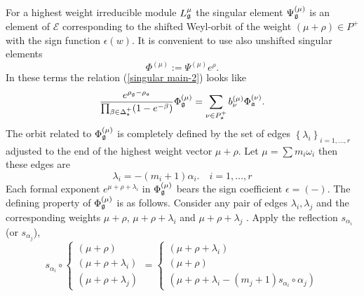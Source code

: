 \documentclass[12pt]{article}
\begin{document}
For a highest weight irreducible module $L_{\frak{g}}^{\mu }$ the singular
element $\Psi _{\frak{g}}^{\left( \mu \right) }$ is an element of $\mathcal{E%
}$ corresponding to the shifted Weyl-orbit of the weight $\left( \mu +\rho
\right) \in P^{+}$ with the sign function $\epsilon \left( w\right) $. It is
convenient to use also unshifted singular elements
\begin{equation}
\Phi ^{\left( \mu \right) }:=\Psi ^{\left( \mu \right) }e^{\rho }.
\label{definition Phi}
\end{equation}
In these terms the relation (\ref{singular main-2}) looks like
\begin{equation}
\frac{e^{\rho _{\frak{g}}-\rho _{\frak{a}}}}{\prod_{\beta \in \Delta _{\frak{%
s}}^{+}}(1-e^{-\beta })}\Phi _{\frak{g}}^{\left( \mu \right) }=\sum_{\nu \in
P_{\frak{a}}^{+}}b_{\nu }^{(\mu )}\Phi _{\frak{a}}^{\left( \nu \right) }.
\label{singular main-3}
\end{equation}
The orbit related to $\Phi _{\frak{g}}^{\left( \mu \right) }$ is completely
defined by the set of edges $\left\{ \lambda _{i}\right\} _{i=1,\dots ,r}$
adjusted to the end of the highest weight vector $\mu +\rho $. Let $\mu
=\sum m_{i}\omega _{i}$ then these edges are
\begin{equation}
\lambda _{i}=-\left( m_{i}+1\right) \alpha _{i}.\quad i=1,\dots ,r
\label{edge}
\end{equation}
Each formal exponent $e^{\mu +\rho +\lambda _{i}}$ in $\Phi _{\frak{g}%
}^{\left( \mu \right) }$ bears the sign coefficient $\epsilon =(-)$. The
defining property of $\Phi _{\frak{g}}^{\left( \mu \right) }$ is as follows.
Consider any pair of edges $\lambda _{i},\lambda _{j}$ and the corresponding
weights $\mu +\rho $, $\mu +\rho +\lambda _{i}$ and $\mu +\rho +\lambda _{j}$%
. Apply the reflection $s_{\alpha _{i}}$ (or $s_{\alpha _{j}}$),
\begin{equation}
s_{\alpha _{i}}\circ \left\{
\begin{array}{l}
\left( \mu +\rho \right)  \\
\left( \mu +\rho +\lambda _{i}\right)  \\
\left( \mu +\rho +\lambda _{j}\right)
\end{array}
\right. =\left\{
\begin{array}{l}
\left( \mu +\rho +\lambda _{i}\right)  \\
\left( \mu +\rho \right)  \\
\left( \mu +\rho +\lambda _{i}-(m_{j}+1)s_{\alpha _{i}}\circ \alpha
_{j}\right)
\end{array}
\right.   \label{reflected triple}
\end{equation}
\end{document}
